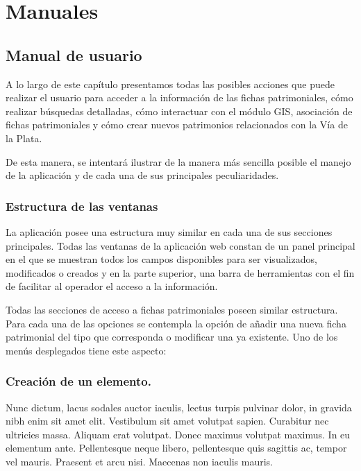 \chapter{Manuales}\label{cap6}
\section{Manual de usuario}

A lo largo de este capítulo presentamos todas las posibles acciones que puede
realizar el usuario para acceder a la información de las fichas patrimoniales,
cómo realizar búsquedas detalladas, cómo interactuar con el módulo GIS,
asociación de fichas patrimoniales y cómo crear nuevos patrimonios relacionados
con la Vía de la Plata. 

De esta manera, se intentará ilustrar de la manera más sencilla posible el
manejo de la aplicación y de cada una de sus principales peculiaridades.

\subsection{Estructura de las ventanas}

La aplicación posee una estructura muy similar en cada una de sus secciones
principales. Todas las ventanas de la aplicación web constan de un panel
principal en el que se muestran todos los campos disponibles para ser
visualizados, modificados o creados y en la parte superior, una barra de
herramientas con el fin de facilitar al operador el acceso a la información.

Todas las secciones de acceso a fichas patrimoniales poseen similar estructura.
Para cada una de las opciones se contempla la opción de añadir una nueva ficha
patrimonial del tipo que corresponda o modificar una ya existente. Uno de los
menús desplegados tiene este aspecto:

\subsection{Creación de un elemento.}

Nunc dictum, lacus sodales auctor iaculis, lectus turpis pulvinar dolor, in
gravida nibh enim sit amet elit. Vestibulum sit amet volutpat sapien. Curabitur
nec ultricies massa. Aliquam erat volutpat. Donec maximus volutpat maximus. In
eu elementum ante. Pellentesque neque libero, pellentesque quis sagittis ac,
tempor vel mauris. Praesent et arcu nisi. Maecenas non iaculis mauris.

